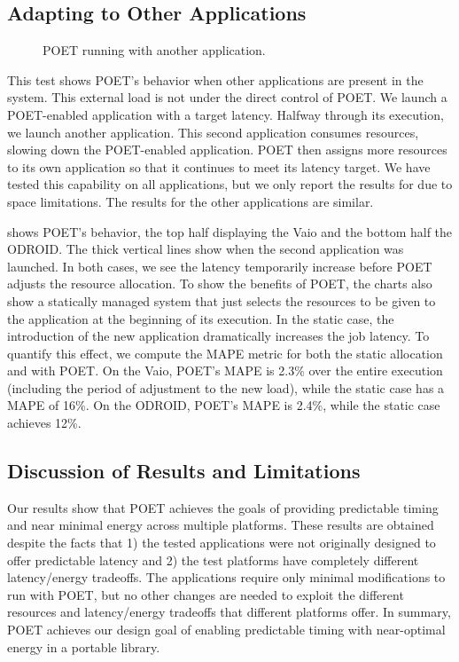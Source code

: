 \subsection{Adapting to Other Applications}
\label{sec:poet-eval-multiapp}

\begin{figure}[t]
  \centering
      
  \caption{POET running with another application.}
  \label{fig:poet-multiapp}
\end{figure}

This test shows POET's behavior when other applications are present in the system.
This external load is not under the direct control of POET.
We launch a POET-enabled application with a target latency.
Halfway through its execution, we launch another application.
This second application consumes resources, slowing down the POET-enabled application.
POET then assigns more resources to its own application so that it continues to meet its latency target.
We have tested this capability on all applications, but we only report the results for  due to space limitations.
The results for the other applications are similar.

 shows POET's behavior, the top half displaying the Vaio and the bottom half the ODROID.
The thick vertical lines show when the second application was launched.
In both cases, we see the latency temporarily increase before POET adjusts the resource allocation.
To show the benefits of POET, the charts also show a statically managed system that just selects the resources to be given to the application at the beginning of its execution.
In the static case, the introduction of the new application dramatically increases the job latency.
To quantify this effect, we compute the MAPE metric for both the static allocation and with POET.
On the Vaio, POET's MAPE is 2.3\% over the entire execution (including the period of adjustment to the new load), while the static case has a MAPE of 16\%.
On the ODROID, POET's MAPE is 2.4\%, while the static case achieves 12\%.


\subsection{Discussion of Results and Limitations}

Our results show that POET achieves the goals of providing predictable timing and near minimal energy across multiple platforms.
These results are obtained despite the facts that 1) the tested applications were not originally designed to offer predictable latency and 2) the test platforms have completely different latency/energy tradeoffs.
The applications require only minimal modifications to run with POET, but no other changes are needed to exploit the different resources and latency/energy tradeoffs that different platforms offer.
In summary, POET achieves our design goal of enabling predictable timing with near-optimal energy in a portable library.

